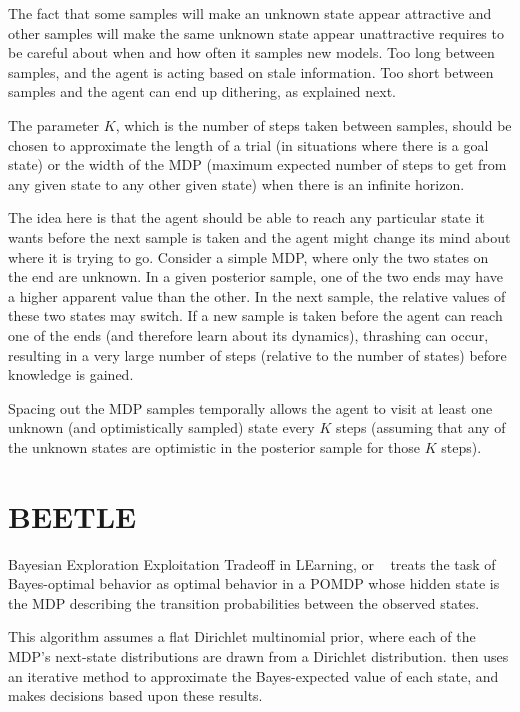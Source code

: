 The fact that some samples will make an unknown state appear attractive and other samples will make the same unknown state appear unattractive requires  to be careful about when and how often it samples new models. Too long between samples, and the agent is acting based on stale information.  Too short between samples and the agent can end up dithering, as explained next.

The parameter $K$, which is the number of steps taken between samples, should be chosen to approximate the length of a trial (in situations where there is a goal state) or the width of the MDP (maximum expected number of steps to get from any given state to any other given state) when there is an infinite horizon.

The idea here is that the agent should be able to reach any particular state it wants before the next sample is taken and the agent might change its mind about where it is trying to go. Consider a simple  MDP, where only the two states on the end are unknown. In a given posterior sample, one of the two ends may have a higher apparent value than the other. In the next sample, the relative values of these two states may switch. If a new sample is taken before the agent can reach one of the ends (and therefore learn about its dynamics), thrashing  can occur, resulting in a very large number of steps (relative to the number of states) before knowledge is gained.

Spacing out the MDP samples temporally allows the agent to visit at least one unknown (and optimistically sampled) state every $K$ steps (assuming that any of the unknown states are optimistic in the posterior sample for those $K$ steps). 



\section{BEETLE}

Bayesian Exploration Exploitation Tradeoff in LEarning, or ~\cite{poupart06} treats the task of Bayes-optimal behavior as optimal behavior in a POMDP whose hidden state is the MDP describing the transition probabilities between the observed states.

This algorithm assumes a flat Dirichlet multinomial prior, where each of the MDP's next-state distributions are drawn from a Dirichlet distribution.  then uses an iterative method  to approximate the Bayes-expected value of each state, and makes decisions based upon these results. 


